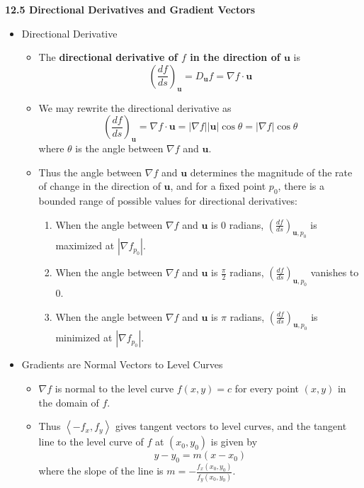 \documentclass[12pt]{article}
\renewcommand{\vec}[1]{\mathbf{#1}}
\newcommand{\<}{\left<}
\renewcommand{\>}{\right>}
\begin{document}
  \centerline{\bf 12.5 Directional Derivatives and Gradient Vectors}
  
  \begin{itemize}
  
  \item Directional Derivative
  
    \begin{itemize}
    \item The \textbf{directional derivative of $f$ in the direction of $\vec{u}$} is \[ \left(\frac{df}{ds}\right)_{\vec{u}} = D_{\vec{u}}f = \nabla f \cdot \vec{u}\]
    \item We may rewrite the directional derivative as \[\left(\frac{df}{ds}\right)_{\vec{u}}=\nabla f \cdot \vec{u}=|\nabla f||\vec{u}|\cos \theta = |\nabla f|\cos \theta\] where $\theta$ is the angle between $\nabla f$ and $\vec{u}$.
    \item Thus the angle between $\nabla f$ and $\vec{u}$ determines the magnitude of the rate of change in the direction of $\vec{u}$, and for a fixed point $p_0$, there is a bounded range of possible values for directional derivatives:
      \begin{enumerate}
      \item When the angle between $\nabla f$ and $\vec{u}$ is $0$ radians, $\left(\frac{df}{ds}\right)_{\vec{u},p_0}$ is maximized at $|\nabla f_{p_0}|$.
      \item When the angle between $\nabla f$ and $\vec{u}$ is $\frac{\pi}{2}$ radians, $\left(\frac{df}{ds}\right)_{\vec{u},p_0}$ vanishes to $0$.
      \item When the angle between $\nabla f$ and $\vec{u}$ is $\pi$ radians, $\left(\frac{df}{ds}\right)_{\vec{u},p_0}$ is minimized at $|\nabla f_{p_0}|$.
      \end{enumerate}
    \end{itemize}
    
  \item Gradients are Normal Vectors to Level Curves
    \begin{itemize}
      \item $\nabla f$ is normal to the level curve $f(x,y)=c$ for every point $(x,y)$ in the domain of $f$.
      \item Thus $\<-f_x,f_y\>$ gives tangent vectors to level curves, and the tangent line to the level curve of $f$ at $(x_0,y_0)$ is given by \[y-y_0=m(x-x_0)\] where the slope of the line is $m = -\frac{f_x(x_0,y_0)}{f_y(x_0,y_0)}$.
    \end{itemize}


\end{itemize}
\end{document}
